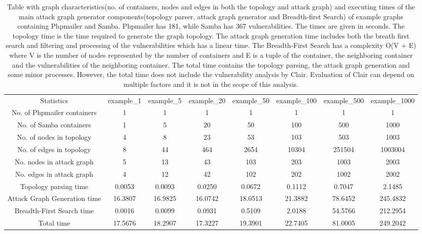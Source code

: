 \documentclass[letterpaper, 10 pt, conference]{ieeeconf}  %
\begin{document}
\begin{table*}[t]
\begin{center}
	\begin{tabular}{ |c|c|c|c|c|c|c|c| } 
		\hline
		Statistics & example\_1 & example\_5 & example\_20 & example\_50 & example\_100 & example\_500 & example\_1000 \\ 
		
		No. of Phpmailer containers & 1 & 1 & 1 & 1 & 1 & 1 & 1 \\ 
		
		No. of Samba containers & 1 & 5 & 20 & 50 & 100 & 500 & 1000 \\ 
		
		No. of nodes in topology & 4 & 8 & 23 & 53 & 103 & 503 & 1003\\ 
		
	    No. of edges in topology & 8 & 44 & 464 & 2654 & 10304 & 251504 & 1003004 \\ 
		
		No. nodes in attack graph & 5 & 13 & 43 & 103 & 203 & 1003 & 2003 \\ 
		
		No. edges in attack graph & 4 & 12 & 42 & 102 & 202 & 1002 & 2002 \\ 
		
		Topology parsing time & 0.0053 & 0.0093 & 0.0250 & 0.0672 & 0.1112 & 0.7047 & 2.1485 \\ 
		
		Attack Graph Generation time & 16.3807 & 16.9825 & 16.0742 & 18.0513 & 21.3882 & 78.6452 & 245.4832 \\ 
		
		Breadth-First Search time & 0.0016 & 0.0099 & 0.0931 & 0.5109 & 2.0188 & 54.5766 & 212.2954 \\ 
		
		Total time & 17.5676 & 18.2907 & 17.3227 & 19.3901 & 22.7405 & 81.0005 & 249.2042 \\ 
		\hline
	\end{tabular}
\end{center}

\caption{Table with graph characteristics(no. of containers, nodes and edges in both the topology and attack graph) and executing times of the main attack graph generator components(topology parser, attack graph generator and Breadth-first Search) of example graphs containing Phpmailer and Samba. Phpmailer has 181, while Samba has 367 vulnerabilities. The times are given in seconds. The topology time is the time required to generate the graph topology. The attack graph generation time includes both  the breath first search and filtering and processing of the vulnerabilities which has a linear time. The Breadth-First Search has a complexity O(V + E) where V is the number of nodes represented by the number of containers and E is a tuple of the container, the neighboring container and the vulnerabilities of the neighboring container.  The total time contains the topology parsing, the attack graph generation and some minor processes. However, the total time does not include the vulnerability analysis by Clair. Evaluation of Clair can depend on multiple factors and it is not in the scope of this analysis.}


\end{table*}
\end{document}
